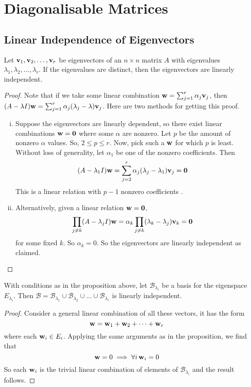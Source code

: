 \documentclass{article}
\begin{document}
\section{Diagonalisable Matrices}
\subsection{Linear Independence of Eigenvectors}
\begin{proposition}
    Let $\vb v_1, \vb v_2, \dots, \vb v_r$ be eigenvectors of an $n\times n$ matrix $A$ with eigenvalues $\lambda_1, \lambda_2,\dots,\lambda_r$. If the eigenvalues are distinct, then the eigenvectors are linearly independent.
\end{proposition}
\begin{proof}
    Note that if we take some linear combination $\vb w = \sum_{j=1}^r \alpha_j\vb v_j$, then $(A - \lambda I)\vb w = \sum_{j=1}^r \alpha_j(\lambda_j - \lambda)\vb v_j$. Here are two methods for getting this proof.
    \begin{enumerate}[(i)]
        \item Suppose the eigenvectors are linearly dependent, so there exist linear combinations $\vb w = \vb 0$ where some $\alpha$ are nonzero. Let $p$ be the amount of nonzero $\alpha$ values. So, $2 \leq p \leq r$. Now, pick such a $\vb w$ for which $p$ is least. Without loss of generality, let $\alpha_1$ be one of the nonzero coefficients. Then
              \[ (A - \lambda_1 I)\vb w = \sum_{j=2}^r \alpha_j(\lambda_j - \lambda_1)\vb v_j = \vb 0 \]
              This is a linear relation with $p-1$ nonzero coefficients \contradiction.
        \item Alternatively, given a linear relation $\vb w=\vb 0$,
              \[ \prod_{j \neq k} (A - \lambda_j I) \vb w = \alpha_k \prod_{j \neq k} (\lambda_k - \lambda_j) \vb v_k = \vb 0 \]
              for some fixed $k$. So $\alpha_k = 0$. So the eigenvectors are linearly independent as claimed.
    \end{enumerate}
\end{proof}
\begin{corollary}
    With conditions as in the proposition above, let $\mathcal B_{\lambda_i}$ be a basis for the eigenspace $E_{\lambda_i}$. Then $\mathcal B = \mathcal B_{\lambda_1} \cup \mathcal B_{\lambda_2} \cup \dots \cup \mathcal B_{\lambda_r}$ is linearly independent.
\end{corollary}
\begin{proof}
    Consider a general linear combination of all these vectors, it has the form
    \[ \vb w = \vb w_1 + \vb w_2 + \dots + \vb w_r \]
    where each $\vb w_i \in E_i$. Applying the same arguments as in the proposition, we find that
    \[ \vb w = 0 \implies \forall i\,\vb w_i = 0 \]
    So each $\vb w_i$ is the trivial linear combination of elements of $\mathcal B_{\lambda_i}$ and the result follows.
\end{proof}
\end{document}
